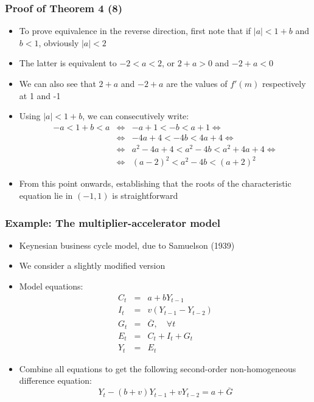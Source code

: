 \documentclass[10pt,usenames,dvipsnames]{beamer}
\theoremstyle{definition}
\begin{document}
\begin{frame}[fragile]
\frametitle{Proof of Theorem 4 (8)}
\begin{itemize}
	\item To prove equivalence in the reverse direction, first note that if $|a| < 1 + b$ and $b < 1$, obviously $|a| < 2$
	\item The latter is equivalent to $-2 < a < 2$, or $2 + a > 0$ and $-2 + a < 0$
	\item We can also see that $2 + a$ and $-2 + a$ are the values of $f'(m)$ respectively at 1 and -1
	\item Using $|a| < 1 + b$, we can consecutively write:
	\[
		\begin{array}{lcl}
			-a < 1 + b < a & \Leftrightarrow & -a + 1 < -b < a + 1 \Leftrightarrow \\
			& \Leftrightarrow & -4a + 4 < -4b < 4a + 4 \Leftrightarrow\\
			& \Leftrightarrow & a^{2} - 4a + 4 < a^{2} - 4b < a^{2} + 4a + 4 \Leftrightarrow\\
			& \Leftrightarrow & (a - 2)^{2} < a^{2} - 4b < (a + 2)^{2} 			
		\end{array}
	\]
	\item From this point onwards, establishing that the roots of the characteristic equation lie in $(-1,1)$ is straightforward
\end{itemize}
\end{frame}

\begin{frame}[fragile]
\frametitle{Example: The multiplier-accelerator model}
\begin{itemize}
	\item Keynesian business cycle model, due to Samuelson (1939)
	\item We consider a slightly modified version
	\item Model equations:
	\[
		\begin{array}{lcl}
			C_{t} & = & a + bY_{t-1}\\
			I_{t} & = & v(Y_{t-1} - Y_{t-2})\\
			G_{t} & = & \overline{G}, \quad \forall t\\
			E_{t} & = & C_{t} + I_{t} + G_{t}\\
			Y_{t} & = & E_{t}
		\end{array}
	\]
	\item Combine all equations to get the following second-order non-homogeneous difference equation:
	\[
		Y_{t} - (b + v)Y_{t-1} + vY_{t-2} = a + \overline{G}
	\]
\end{itemize}
\end{frame}
\end{document}
